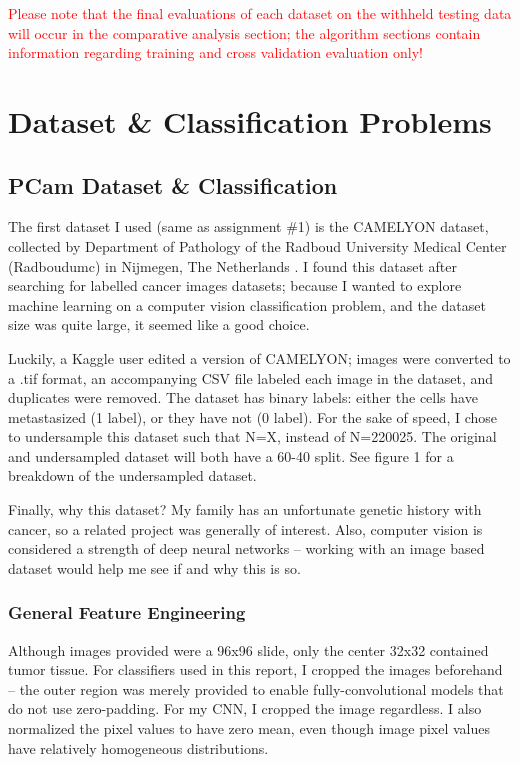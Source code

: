 \documentclass[a4paper]{article}
\begin{document}
\textcolor{red}{Please note that the final evaluations of each dataset on the withheld testing data will occur in the comparative analysis section; the algorithm sections contain information regarding training and cross validation evaluation only!}

\section{Dataset \& Classification Problems}
\subsection{PCam Dataset \& Classification}

The first dataset I used (same as assignment \#1) is the CAMELYON dataset, collected by Department of Pathology of the Radboud University Medical Center (Radboudumc) in Nijmegen, The Netherlands \autocite{doi:10.1093/gigascience/giy065}. I found this dataset after searching for labelled cancer images datasets; because I wanted to explore machine learning on a computer vision classification problem, and the dataset size was quite large, it seemed like a good choice. 

Luckily, a Kaggle user edited a version of CAMELYON; images were converted to a .tif format, an accompanying CSV file labeled each image in the dataset, and duplicates were removed. The dataset has binary labels: either the cells have metastasized (1 label), or they have not (0 label). For the sake of speed, I chose to undersample this dataset such that N=X, instead of N=220025. The original and undersampled dataset will both have a 60-40 split. See figure 1 for a breakdown of the undersampled dataset. 

Finally, why this dataset? My family has an unfortunate genetic history with cancer, so a related project was generally of interest. Also, computer vision is considered a strength of deep neural networks -- working with an image based dataset would help me see if and why this is so.

\subsubsection{General Feature Engineering}
Although images provided were a 96x96 slide, only the center 32x32 contained tumor tissue. For classifiers used in this report, I cropped the images beforehand -- the outer region was merely provided to enable fully-convolutional models that do not use zero-padding\autocite{Kaggle-PCam}. For my CNN, I cropped the image regardless. I also normalized the pixel values to have zero mean, even though image pixel values have relatively homogeneous distributions. 
\end{document}
